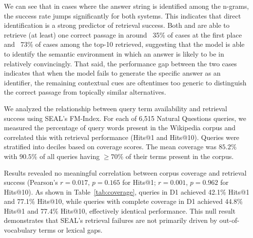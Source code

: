 We can see that in cases where the answer string is identified among the n-grams, the success rate jumps significantly for both systems. This indicates that direct identification is a strong predictor of retrieval success. Both  and  are able to retrieve (at least) one correct passage in around ~35\% of cases at the first place and ~73\% of cases among the top-10 retrieved, suggesting that the model is able to identify the semantic environment in which an answer is likely to be in relatively convincingly. That said, the performance gap between the two cases indicates that when the model fails to generate the specific answer as an identifier, the remaining contextual cues are oftentimes too generic to distinguish the correct passage from topically similar alternatives.

We analyzed the relationship between query term availability and retrieval success using SEAL's FM-Index. For each of 6,515 Natural Questions queries, we measured the percentage of query words present in the Wikipedia corpus and correlated this with retrieval performance (Hits@1 and Hits@10). Queries were stratified into deciles based on coverage scores. The mean coverage was $85.2\%$ with $90.5\%$ of all queries having $\geq70\%$ of their terms present in the corpus.


Results revealed no meaningful correlation between corpus coverage and retrieval success (Pearson's $r = 0.017$, $p = 0.165$ for Hits@1; $r = 0.001$, $p = 0.962$ for Hits@10). As shown in Table~\ref{tab:coverage}, queries in D1 achieved 42.1\% Hits@1 and 77.1\% Hits@10, while queries with complete coverage in D1 achieved 44.8\% Hits@1 and 77.4\% Hits@10, effectively identical performance. This null result demonstrates that SEAL's retrieval failures are not primarily driven by out-of-vocabulary terms or lexical gaps.


